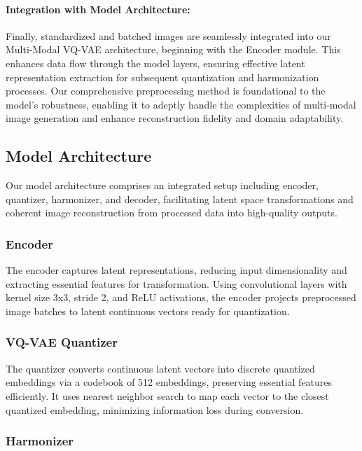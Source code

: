 \paragraph{Integration with Model Architecture:}

Finally, standardized and batched images are seamlessly integrated into our Multi-Modal VQ-VAE architecture, beginning with the Encoder module. This enhances data flow through the model layers, ensuring effective latent representation extraction for subsequent quantization and harmonization processes. Our comprehensive preprocessing method is foundational to the model's robustness, enabling it to adeptly handle the complexities of multi-modal image generation and enhance reconstruction fidelity and domain adaptability.

\subsection{Model Architecture}

Our model architecture comprises an integrated setup including encoder, quantizer, harmonizer, and decoder, facilitating latent space transformations and coherent image reconstruction from processed data into high-quality outputs.

\subsubsection{Encoder}

The encoder captures latent representations, reducing input dimensionality and extracting essential features for transformation. Using convolutional layers with kernel size 3x3, stride 2, and ReLU activations, the encoder projects preprocessed image batches to latent continuous vectors ready for quantization.

\subsubsection{VQ-VAE Quantizer}

The quantizer converts continuous latent vectors into discrete quantized embeddings via a codebook of 512 embeddings, preserving essential features efficiently. It uses nearest neighbor search to map each vector to the closest quantized embedding, minimizing information loss during conversion.

\subsubsection{Harmonizer}

